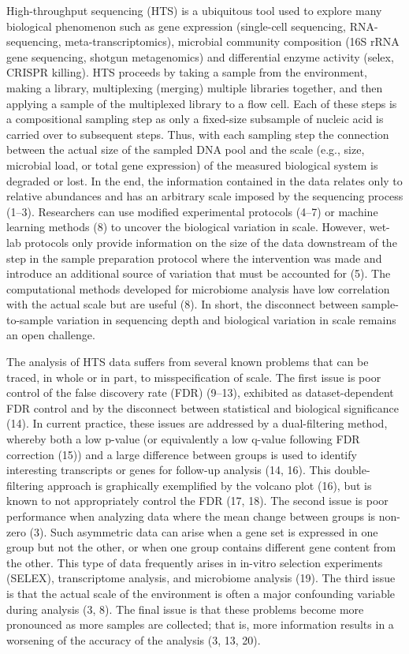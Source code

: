 \documentclass[
]{article}
\begin{document}
High-throughput sequencing (HTS) is a ubiquitous tool used to explore
many biological phenomenon such as gene expression (single-cell
sequencing, RNA-sequencing, meta-transcriptomics), microbial community
composition (16S rRNA gene sequencing, shotgun metagenomics) and
differential enzyme activity (selex, CRISPR killing). HTS proceeds by
taking a sample from the environment, making a library, multiplexing
(merging) multiple libraries together, and then applying a sample of the
multiplexed library to a flow cell. Each of these steps is a
compositional sampling step as only a fixed-size subsample of nucleic
acid is carried over to subsequent steps. Thus, with each sampling step
the connection between the actual size of the sampled DNA pool and the
scale (e.g., size, microbial load, or total gene expression) of the
measured biological system is degraded or lost. In the end, the
information contained in the data relates only to relative abundances
and has an arbitrary scale imposed by the sequencing process (1--3).
Researchers can use modified experimental protocols (4--7) or machine
learning methods (8) to uncover the biological variation in scale.
However, wet-lab protocols only provide information on the size of the
data downstream of the step in the sample preparation protocol where the
intervention was made and introduce an additional source of variation
that must be accounted for (5). The computational methods developed for
microbiome analysis have low correlation with the actual scale but are
useful (8). In short, the disconnect between sample-to-sample variation
in sequencing depth and biological variation in scale remains an open
challenge.

The analysis of HTS data suffers from several known problems that can be
traced, in whole or in part, to misspecification of scale. The first
issue is poor control of the false discovery rate (FDR) (9--13),
exhibited as dataset-dependent FDR control and by the disconnect between
statistical and biological significance (14). In current practice, these
issues are addressed by a dual-filtering method, whereby both a low
p-value (or equivalently a low q-value following FDR correction (15))
and a large difference between groups is used to identify interesting
transcripts or genes for follow-up analysis (14, 16). This
double-filtering approach is graphically exemplified by the volcano plot
(16), but is known to not appropriately control the FDR (17, 18). The
second issue is poor performance when analyzing data where the mean
change between groups is non-zero (3). Such asymmetric data can arise
when a gene set is expressed in one group but not the other, or when one
group contains different gene content from the other. This type of data
frequently arises in in-vitro selection experiments (SELEX),
transcriptome analysis, and microbiome analysis (19). The third issue is
that the actual scale of the environment is often a major confounding
variable during analysis (3, 8). The final issue is that these problems
become more pronounced as more samples are collected; that is, more
information results in a worsening of the accuracy of the analysis (3,
13, 20).
\end{document}

